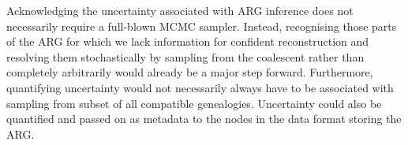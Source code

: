 \documentclass{article}
\newcommand{\tsinfer}[0]{\texttt{tsinfer}}
\newcommand{\kwarg}[0]{\texttt{KwARG}}
\newcommand{\argneedle}[0]{\texttt{ARG-Needle}}
\newcommand{\argweaver}[0]{\texttt{ARGweaver}}
\newcommand{\relate}[0]{\texttt{Relate}}
\begin{document}
Acknowledging the uncertainty associated with ARG inference does not
necessarily require a full-blown MCMC sampler. Instead, recognising those parts of
the ARG for which we lack information for confident reconstruction and resolving
them stochastically by sampling from the coalescent rather than completely arbitrarily
would already be a major step forward.
Furthermore, quantifying uncertainty would not necessarily always have to be associated
with sampling from subset of all compatible genealogies. Uncertainty could also
be quantified and passed on as metadata to the nodes in the data format storing the ARG.




\end{document}
